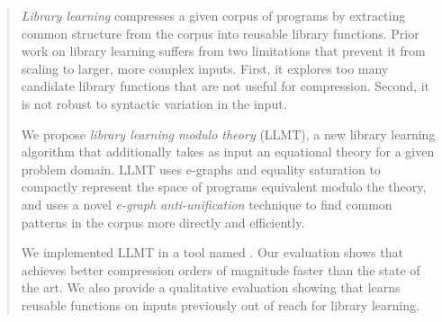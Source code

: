 \begin{abstract}
\emph{Library learning}
  compresses a given corpus of programs
  by extracting common structure from
  the corpus into reusable library functions.
Prior work on library learning suffers from two limitations
 that prevent it from scaling to larger, more complex inputs.
First, it explores too many candidate library functions
  that are not useful for compression. 
Second, it is not robust to syntactic variation in
 the input.

We propose \emph{library learning modulo theory} (LLMT),
 a new library learning algorithm
 that additionally takes as input
 an equational theory for a given problem domain.
LLMT uses e-graphs and equality saturation
 to compactly represent the space of programs equivalent modulo the theory,
 and uses a novel \emph{e-graph anti-unification} technique
 to find common patterns in the corpus more directly and efficiently.

We implemented LLMT in a tool named \tool.
Our evaluation shows that \tool
 achieves better compression orders of magnitude faster
 than the state of the art.
We also provide a qualitative evaluation
 showing that \tool learns reusable functions
 on inputs previously out of reach for library learning.

\end{abstract}
